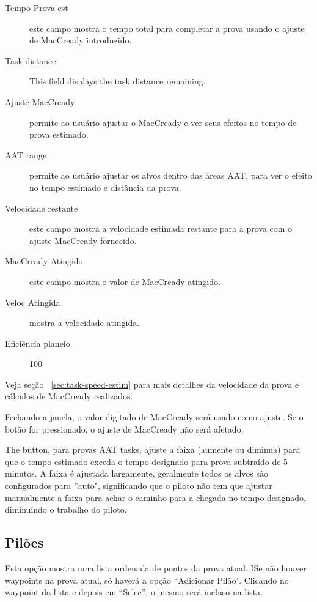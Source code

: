 \begin{description}
\item[Tempo Prova est]  este campo mostra o tempo total para completar a prova usando o ajuste de MacCready introduzido.
\item[Task distance]  This field displays the task distance remaining.
\item[Ajuste MacCready]  permite ao usuário ajustar o MacCready e ver seus efeitos no tempo de prova estimado.
\item[AAT range]  permite ao usuário ajustar os alvos dentro das áreas AAT, para ver o efeito no tempo estimado e distância da prova.
\item[Velocidade restante]  este campo mostra a velocidade estimada restante para a prova com o ajuste MacCready fornecido.
\item[MacCready Atingido]  este campo mostra o valor de MacCready atingido.
\item[Veloc Atingida] mostra a velocidade atingida.
\item[Eficiência planeio]  100%
\end{description}
Veja seção ~\ref{sec:task-speed-estim} para mais detalhes da velocidade da prova e cálculos de MacCready realizados.

Fechando a janela, o valor digitado de MacCready será usado como ajuste. Se o botão  for pressionado, o ajuste de MacCready não será afetado.

The  button, para provas AAT tasks, ajuste a faixa (aumente ou diminua) para que o tempo estimado exceda o tempo designado para prova subtraído de 5 minutos. A faixa é ajustada largamente, geralmente todos os alvos são configurados para ''auto", significando que o piloto não tem que ajustar manualmente a faixa para achar o caminho para a chegada no tempo designado, diminuindo o trabalho do piloto.
  
\subsection*{Pilões}
Esta opção mostra uma lista ordenada de pontos da prova atual.
ISe não houver waypoints na prova atual, só haverá a opção “Adicionar Pilão”.  Clicando no waypoint da lista e depois em “Selec”, o mesmo será incluso na lista.  

